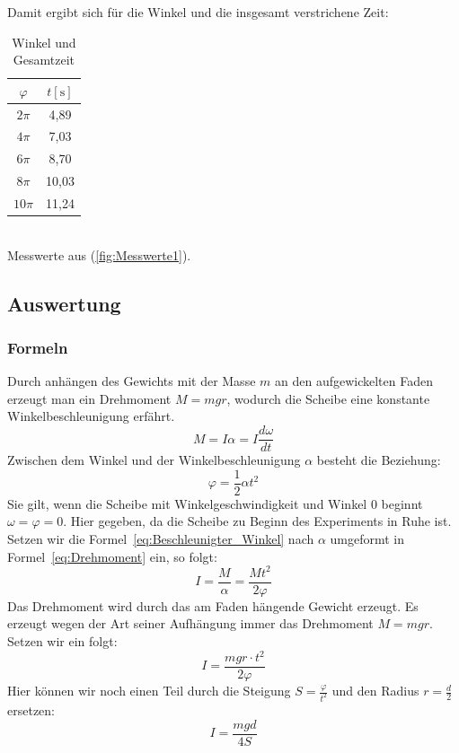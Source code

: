 \documentclass{article}
\begin{document}
	Damit ergibt sich für die Winkel und die insgesamt verstrichene Zeit:
	\begin{table}[!ht]
		\centering
		\begin{tabular}{ | c | c | }
			\hline
			\( \varphi \) & \(t [\unit{\second}]\) \\
			\hline
			\( 2\pi \)    & 4,89 \\
			\( 4\pi \)    & 7,03 \\
			\( 6\pi \)    & 8,70 \\
			\( 8\pi \)    & 10,03 \\
			\( 10\pi \)   & 11,24 \\
			\hline
		\end{tabular}
		\caption{\label{tab:Winkel_Gesamtzeit}Winkel und Gesamtzeit}
	\end{table} \\
	Messwerte aus (\ref{fig:Messwerte1}).

	\subsection{Auswertung}
	\subsubsection{Formeln}
	Durch anhängen des Gewichts mit der Masse \(m\) an den aufgewickelten Faden erzeugt man ein Drehmoment \(M = m g r\), wodurch die Scheibe eine konstante Winkelbeschleunigung erfährt.
	\begin{equation} \label{eq:Drehmoment}
		M = I \alpha = I \frac{d\omega}{dt}
	\end{equation}
	Zwischen dem Winkel und der Winkelbeschleunigung \( \alpha \) besteht die Beziehung:
	\begin{equation} \label{eq:Beschleunigter_Winkel}
		\varphi = \frac{1}{2} \alpha t^2
	\end{equation}
	Sie gilt, wenn die Scheibe mit Winkelgeschwindigkeit und Winkel 0 beginnt \(\omega = \varphi = 0\).
	Hier gegeben, da die Scheibe zu Beginn des Experiments in Ruhe ist.
	Setzen wir die Formel~\ref{eq:Beschleunigter_Winkel} nach \( \alpha \) umgeformt in Formel~\ref{eq:Drehmoment} ein, so folgt:
	\begin{equation}
		I = \frac{M}{\alpha} = \frac{ Mt^2 }{2 \varphi}
	\end{equation}
	Das Drehmoment wird durch das am Faden hängende Gewicht erzeugt. Es erzeugt wegen der Art seiner Aufhängung immer das Drehmoment \( M = m g r \). Setzen wir ein folgt:
	\begin{equation}
		I = \frac{ m g r \cdot t^2 }{ 2 \varphi }
	\end{equation}
	Hier können wir noch einen Teil durch die Steigung \(S = \frac{ \varphi }{ t^2 } \) und den Radius \(r = \frac{d}{2}\) ersetzen:
	\begin{equation}\label{eq:Trägheitsmoment_komplett}
		I = \frac{mgd}{4S}
	\end{equation}
\end{document}
